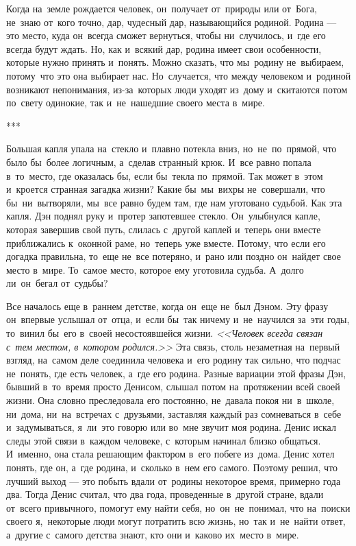 \lettrine[lines=3, loversize=0.1]{К}{}огда на~земле рождается человек, он~получает от~природы или от~Бога, не~знаю от~кого точно, дар, чудесный дар, называющийся родиной.
Родина --- это место, куда он~всегда сможет вернуться, чтобы ни~случилось, и~где его всегда будут ждать.
Но, как и~всякий дар, родина имеет свои особенности, которые нужно принять и~понять.
Можно сказать, что мы~родину не~выбираем, потому~что это она выбирает нас.
Но~случается, что между человеком и~родиной возникают непонимания, из-за~которых люди уходят из~дому и~скитаются потом по~свету одинокие, так и~не~нашедшие своего места в~мире.
\begin{center}
***
\end{center}



Большая капля упала на~стекло и~плавно потекла вниз, но~не~по~прямой, что было бы~более логичным, а~сделав странный крюк.
И~все равно попала в~то~место, где оказалась бы, если бы~текла по~прямой.
Так может в~этом и~кроется странная загадка жизни? Какие бы~мы~вихры не~совершали, что бы~ни~вытворяли, мы~все равно будем там, где нам уготовано судьбой.
Как эта капля.
Дэн поднял руку и~протер запотевшее стекло.
Он~улыбнулся капле, которая завершив свой путь, слилась с~другой каплей и~теперь они вместе приближались к~оконной раме, но~теперь уже вместе.
Потому, что если его догадка правильна, то~еще не~все потеряно, и~рано или поздно он~найдет свое место в~мире.
То~самое место, которое ему уготовила судьба.
А~долго ли~он~бегал от~судьбы?
 
Все началось еще в~раннем детстве, когда он~еще не~был Дэном.
Эту фразу он~впервые услышал от~отца, и~если бы~так ничему и~не~научился за~эти годы, то~винил бы~его в~своей несостоявшейся жизни.
\textit{<<Человек всегда связан с~тем местом, в~котором родился.>>}
Эта связь, столь незаметная на~первый взгляд, на~самом деле соединила человека и~его родину так сильно, что подчас не~понять, где есть человек, а~где его родина.
Разные вариации этой фразы Дэн, бывший в~то~время просто Денисом, слышал потом на~протяжении всей своей жизни.
Она словно преследовала его постоянно, не~давала покоя ни~в~школе, ни~дома, ни~на~встречах с~друзьями, заставляя каждый раз сомневаться в~себе и~задумываться, я~ли~это говорю или во~мне звучит моя родина.
Денис искал следы этой связи в~каждом человеке, с~которым начинал близко общаться.
И~именно, она стала решающим фактором в~его побеге из~дома.
Денис хотел понять, где он, а~где родина, и~сколько в~нем его самого.
Поэтому решил, что лучший выход --- это побыть вдали от~родины некоторое время, примерно года два.
Тогда Денис считал, что два года, проведенные в~другой стране, вдали от~всего привычного, помогут ему найти себя, но~он~не~понимал, что на~поиски своего я,~некоторые люди могут потратить всю жизнь, но~так и~не~найти ответ, а~другие с~самого детства знают, кто они и~каково их~место в~мире.

